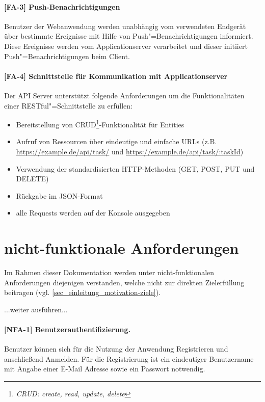 \paragraph{[FA-3] Push-Benachrichtigungen}\label{fa-3} Benutzer der Webanwendung werden unabhängig vom verwendeten Endgerät über bestimmte Ereignisse mit Hilfe von Push"=Benachrichtigungen informiert. Diese Ereignisse werden vom Applicationserver verarbeitet und dieser initiiert Push"=Benachrichtigungen beim Client. 

\paragraph{[FA-4] Schnittstelle für Kommunikation mit Applicationserver}\label{fa-4} Der API Server unterstützt folgende Anforderungen um die Funktionalitäten einer RESTful"=Schnittstelle zu erfüllen:

\begin{itemize}  
\item Bereitstellung von CRUD\footnote{\textit{CRUD: create, read, update, delete}}-Funktionalität für Entities
\item Aufruf von Ressourcen über eindeutige und einfache URLs (z.B. \url{https://example.de/api/task/} und \url{https://example.de/api/task/:taskId}) 
\item Verwendung der standardisierten HTTP-Methoden (GET, POST, PUT und DELETE) 
\item Rückgabe im JSON-Format
\item alle Requests werden auf der Konsole ausgegeben
\end{itemize}

\newpage
\section{nicht-funktionale Anforderungen}
\label{sec_anforderungen_nicht-funktionale-anforderungen}

Im Rahmen dieser Dokumentation werden unter nicht-funktionalen Anforderungen diejenigen verstanden, welche nicht zur direkten Zielerfüllung beitragen (vgl. \ref{sec_einleitung_motivation-ziele}).

...weiter ausführen...

\paragraph{[NFA-1] Benutzerauthentifizierung.} Benutzer können sich für die Nutzung der Anwendung Registrieren und anschließend Anmelden. Für die Registrierung ist ein eindeutiger Benutzername mit Angabe einer E-Mail Adresse sowie ein Passwort notwendig.

